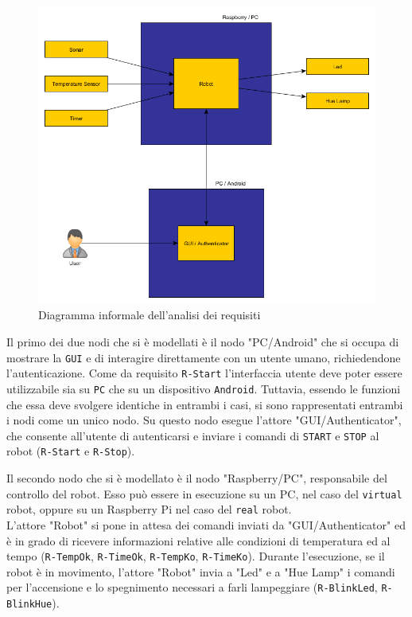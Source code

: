 \documentclass{llncs}
\newcommand{\action}[1]{\texttt{#1}\xspace}
\newcommand{\code}[1]{{\color{blue}\small{\texttt{#1}}}}
\newcommand{\fname}[1]{{\color{magenta}\small{\texttt{#1}}}}
\begin{document}
\begin{figure}[h]
	\centering
	\includegraphics[scale=0.4]{img/requirements_analysis.png}
	\caption{Diagramma informale dell'analisi dei requisiti}
	\label{fig:reqAnalysis}
\end{figure}

Il primo dei due nodi che si è modellati è il nodo "PC/Android" che si occupa di mostrare la \action{GUI} e di interagire direttamente con un utente umano, richiedendone l'autenticazione. Come da requisito \code{R-Start} l'interfaccia utente deve poter essere utilizzabile sia su \action{PC} che su un dispositivo \action{Android}. Tuttavia, essendo le funzioni che essa deve svolgere identiche in entrambi i casi, si sono rappresentati entrambi i nodi come un unico nodo. Su questo nodo esegue l'attore "GUI/Authenticator", che consente all'utente di autenticarsi e inviare i comandi di \action{START} e \action{STOP} al robot (\code{R-Start} e \code{R-Stop}). 

Il secondo nodo che si è modellato è il nodo "Raspberry/PC", responsabile del controllo del robot. Esso può essere in esecuzione su un PC, nel caso del \fname{virtual} robot, oppure su un Raspberry Pi nel caso del \fname{real} robot. \\ L'attore "Robot" si pone in attesa dei comandi inviati da "GUI/Authenticator" ed è in grado di ricevere informazioni relative alle condizioni di temperatura ed al tempo (\code{R-TempOk}, \code{R-TimeOk}, \code{R-TempKo}, \code{R-TimeKo}). Durante l'esecuzione, se il robot è in movimento, l'attore "Robot" invia a "Led" e a "Hue Lamp" i comandi per l'accensione e lo spegnimento necessari a farli lampeggiare (\code{R-BlinkLed}, \code{R-BlinkHue}). 
\end{document}
